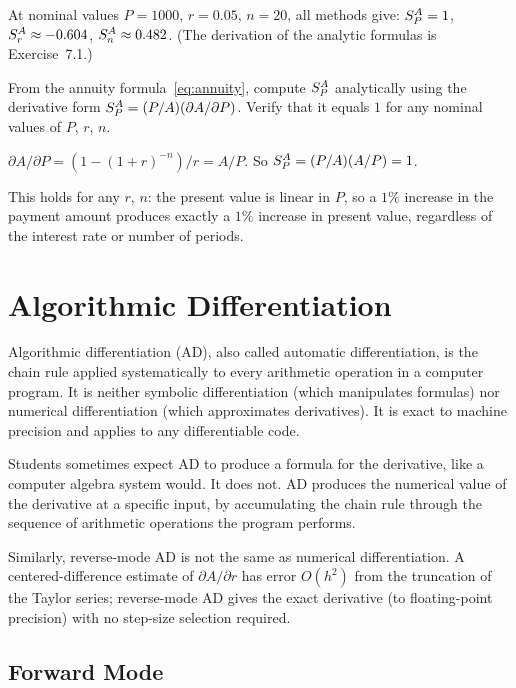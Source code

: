 At nominal values $P = 1000$, $r = 0.05$, $n = 20$, all methods give:
$S_{P}^{A} = 1$, $S_{r}^{A} \approx -0.604$, $S_{n}^{A} \approx 0.482$.
(The derivation of the analytic formulas is Exercise~7.1.)

\begin{selfcheck}
From the annuity formula~\eqref{eq:annuity}, compute $S_{P}^{A}$ analytically
using the derivative form $S_{P}^{A} = (P/A)(\partial A/\partial P)$.
Verify that it equals $1$ for any nominal values of $P$, $r$, $n$.
\end{selfcheck}
\begin{scAnswer}
$\partial A/\partial P = (1-(1+r)^{-n})/r = A/P$.
So $S_{P}^{A} = (P/A)(A/P) = 1$.

This holds for any $r$, $n$: the present value is linear in $P$,
so a $1\%$ increase in the payment amount produces exactly a $1\%$
increase in present value, regardless of the interest rate or
number of periods.
\end{scAnswer}

\section{Algorithmic Differentiation}
\label{sec:AD}

Algorithmic differentiation (AD), also called automatic
differentiation, is the chain rule applied systematically
to every arithmetic operation in a computer program.
It is neither symbolic differentiation (which manipulates formulas)
nor numerical differentiation (which approximates derivatives).
It is exact to machine precision and applies to any differentiable code.

Students sometimes expect AD to produce a formula for the derivative,
like a computer algebra system would. It does not.
AD produces the numerical value of the derivative at a specific
input, by accumulating the chain rule through the sequence of
arithmetic operations the program performs.

Similarly, reverse-mode AD is not the same as numerical differentiation.
A centered-difference estimate of $\partial A/\partial r$ has error
$O(h^2)$ from the truncation of the Taylor series; reverse-mode AD
gives the exact derivative (to floating-point precision) with no
step-size selection required.

\subsection{Forward Mode}


